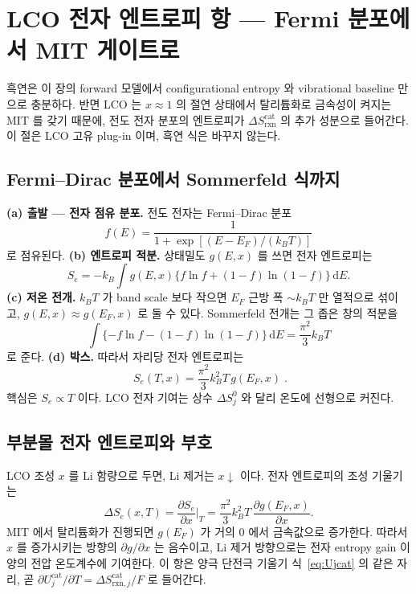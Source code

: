 \documentclass[11pt,a4paper]{article}
\newcommand{\dd}{\mathrm{d}}
\newcommand{\rxn}{\mathrm{rxn}}
\begin{document}
\section{LCO 전자 엔트로피 항 — Fermi 분포에서 MIT 게이트로}\label{sec:electronic_entropy}
흑연은 이 장의 forward 모델에서 configurational entropy 와 vibrational baseline 만으로 충분하다. 반면 LCO 는
$x\approx1$ 의 절연 상태에서 탈리튬화로 금속성이 켜지는 MIT 를 갖기 때문에, 전도 전자 분포의 엔트로피가
$\Delta S_{\rxn}^\mathrm{cat}$ 의 추가 성분으로 들어간다. 이 절은 LCO 고유 plug-in 이며, 흑연 식은 바꾸지 않는다.

\subsection{Fermi--Dirac 분포에서 Sommerfeld 식까지}
\textbf{(a) 출발 — 전자 점유 분포.} 전도 전자는 Fermi--Dirac 분포
\begin{equation}
f(E)=\frac{1}{1+\exp[(E-E_F)/(k_BT)]}
\label{eq:fdist}
\end{equation}
로 점유된다. \textbf{(b) 엔트로피 적분.} 상태밀도 $g(E,x)$ 를 쓰면 전자 엔트로피는
\begin{equation}
S_e=-k_B\int g(E,x)\{f\ln f+(1-f)\ln(1-f)\}\,\dd E.
\label{eq:Seint}
\end{equation}
\textbf{(c) 저온 전개.} $k_BT$ 가 band scale 보다 작으면 $E_F$ 근방 폭 $\sim k_BT$ 만 열적으로 섞이고,
$g(E,x)\approx g(E_F,x)$ 로 둘 수 있다. Sommerfeld 전개는 그 좁은 창의 적분을
\begin{equation}
\int \{ -f\ln f-(1-f)\ln(1-f)\}\,\dd E
=\frac{\pi^2}{3}k_BT
\label{eq:sommerfeldwindow}
\end{equation}
로 준다. \textbf{(d) 박스.} 따라서 자리당 전자 엔트로피는
\begin{equation}
\boxed{\;S_e(T,x)=\frac{\pi^2}{3}k_B^2T\,g(E_F,x)\;}.
\label{eq:Se}
\end{equation}
핵심은 $S_e\propto T$ 이다. LCO 전자 기여는 상수 $\Delta S^0_j$ 와 달리 온도에 선형으로 커진다.

\subsection{부분몰 전자 엔트로피와 부호}
LCO 조성 $x$ 를 Li 함량으로 두면, Li 제거는 $x\downarrow$ 이다. 전자 엔트로피의 조성 기울기는
\begin{equation}
\Delta S_e(x,T)=\frac{\partial S_e}{\partial x}\Big|_T
=\frac{\pi^2}{3}k_B^2T\,\frac{\partial g(E_F,x)}{\partial x}.
\label{eq:dSe}
\end{equation}
MIT 에서 탈리튬화가 진행되면 $g(E_F)$ 가 거의 $0$ 에서 금속값으로 증가한다. 따라서 $x$ 를 증가시키는 방향의
$\partial g/\partial x$ 는 음수이고, Li 제거 방향으로는 전자 entropy gain 이 양의 전압 온도계수에 기여한다. 이 항은
양극 단전극 기울기 식~\eqref{eq:Ujcat} 의 같은 자리, 곧 $\partial U_j^\mathrm{cat}/\partial T=\Delta S_{\rxn,j}^\mathrm{cat}/F$
로 들어간다.
\end{document}
